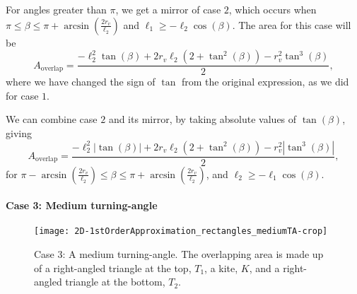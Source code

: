 For angles greater than $\pi$, we get a mirror of case $2$, which occurs when $\pi \leq \beta \leq \pi +\arcsin\left(\frac{2r_v}{\ell_2}\right) $ and $\ell_1 \geq -  \ell_2 \cos (\beta)$. The area for this case will be
\[A_{\text{overlap}} =\frac{-\ell_2^2 \tan(\beta) + 2r_v \ell_2(2+\tan^2(\beta))  - r_v^2 \tan^3(\beta)}{2},\]
where we have changed the sign of $\tan$ from the original expression, as we did for case $1$.

We can combine case $2$ and its mirror, by taking absolute values of $\tan(\beta)$, giving
\[  A_{\text{overlap}} = \frac{-\ell_2^2 \left|\tan(\beta)\right| + 2r_v \ell_2(2+\tan^2(\beta))  - r_v^2 \left|\tan^3(\beta)\right|}{2},\]
for $\pi-\arcsin\left(\frac{2r_v}{\ell_2}\right) \leq \beta \leq \pi+\arcsin\left(\frac{2r_v}{\ell_2}\right)$, and $\ell_2 \geq -  \ell_1 \cos (\beta)$.
\FloatBarrier
\paragraph{Case 3: Medium turning-angle}
\FloatBarrier
\begin{figure}[h!]
	\centering
	\texttt{[image: 2D-1stOrderApproximation\_rectangles\_mediumTA-crop]}
	\caption[Case 3: A medium turning-angle]{Case 3: A medium turning-angle. The overlapping area is made up of a right-angled triangle at the top, $T_1$, a kite, $K$, and a right-angled triangle at the bottom, $T_2$.}
	\label{fig:2d_model:firstorder:case3}
\end{figure}


